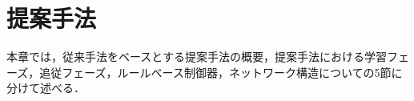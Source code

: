 \chapter{提案手法}

  本章では，従来手法をベースとする提案手法の概要，提案手法における学習フェーズ，追従フェーズ，ルールベース制御器，ネットワーク構造についての5節に分けて述べる．

\label{chap:suggest}
%







%
